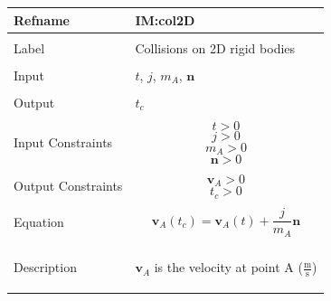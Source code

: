 \documentclass[12pt]{article}
\begin{document}
\noindent \begin{minipage}{\textwidth}
\begin{tabular}{>{\raggedright}p{}>{\raggedright\arraybackslash}p{}}
\toprule \textbf{Refname} & \textbf{IM:col2D}
\label{IM:col2D}
\\ \midrule \\
Label & Collisions on 2D rigid bodies
\\ \midrule \\
Input & $t$, $j$, ${m_{A}}$, $\mathbf{n}$
\\ \midrule \\
Output & ${t_{c}}$
\\ \midrule \\
Input Constraints & \begin{displaymath}
                    t>0
                    \end{displaymath}
                    \begin{displaymath}
                    j>0
                    \end{displaymath}
                    \begin{displaymath}
                    {m_{A}}>0
                    \end{displaymath}
                    \begin{displaymath}
                    \mathbf{n}>0
                    \end{displaymath}
\\ \midrule \\
Output Constraints & \begin{displaymath}
                     {\mathbf{v}_{A}}>0
                     \end{displaymath}
                     \begin{displaymath}
                     {t_{c}}>0
                     \end{displaymath}
\\ \midrule \\
Equation & \begin{displaymath}
           {\mathbf{v}_{A}}\left({t_{c}}\right)={\mathbf{v}_{A}}\left(t\right)+\frac{j}{{m_{A}}} \mathbf{n}
           \end{displaymath}
\\ \midrule \\
Description & \begin{symbDescription}
              \item{${\mathbf{v}_{A}}$ is the velocity at point A ($\frac{\text{m}}{\text{s}}$)}

\end{symbDescription}
\end{tabular}
\end{minipage}
\end{document}
